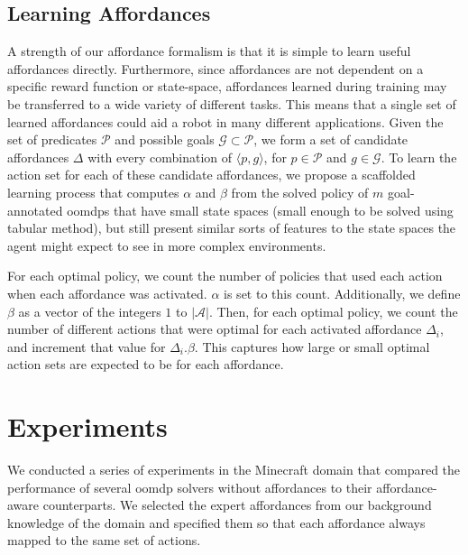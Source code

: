 \documentclass[letterpaper]{article}
\begin{document}
\subsection{Learning Affordances}

A strength of our affordance formalism is that it is simple to learn useful affordances directly. Furthermore, since affordances
are not dependent on a specific reward function or state-space, affordances learned during training may be transferred to a wide variety
of different tasks. This means that a single set of learned affordances could aid a robot in many different applications.
Given the set of predicates $\mathcal{P}$ and possible goals $\mathcal{G} \subset \mathcal{P}$, we form a set of candidate affordances $\Delta$ with every combination of $\langle p, g \rangle$, for $p \in \mathcal{P}$ and $g \in \mathcal{G}$.
To learn the action set for each of these candidate affordances, we propose a scaffolded learning process that computes $\alpha$ and $\beta$ from the
solved policy of $m$ goal-annotated \glspl{oomdp} that have small state spaces (small enough to be solved using tabular method), but still present similar sorts of features to the state spaces the agent might expect to see in more complex environments.

For each optimal policy, we count the number of policies that used each action 
when each affordance was activated. $\alpha$ is set to this count. Additionally, we define $\beta$ as a vector of the integers $1$ to $|\mathcal{A}|$.
Then, for each optimal policy, we count the number of different actions that were optimal for each activated affordance $\Delta_i$, and increment
that value for $\Delta_i.\beta$. This captures how large or small optimal action sets are expected to be for each affordance.


\section{Experiments}
\label{sec:experiments}

We conducted a series of experiments in the Minecraft domain that
compared the performance of several \gls{oomdp} solvers without affordances
to their affordance-aware counterparts. We selected the expert
affordances from our background knowledge of the domain and specified them 
so that each affordance always mapped to the same set of actions.
\end{document}
